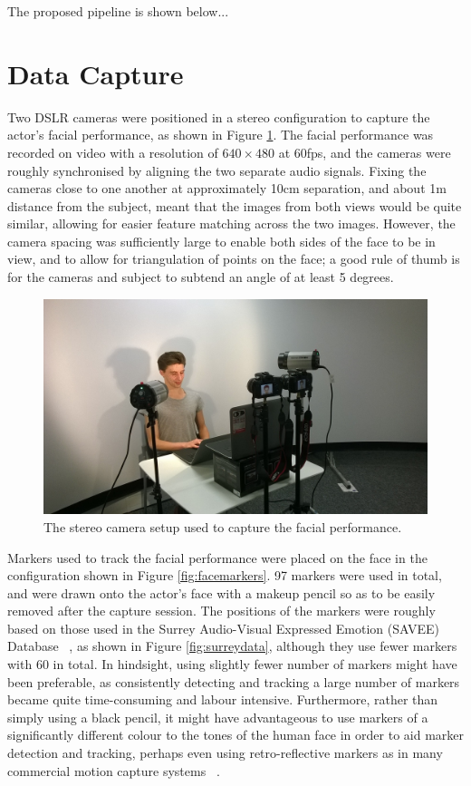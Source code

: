 \documentclass[11pt]{report}
\begin{document}
The proposed pipeline is shown below...

\section{Data Capture} \label{sec:datacapture}

Two DSLR cameras were positioned in a stereo configuration to capture the actor's facial performance, as shown in Figure \ref{fig:setup1}. The facial performance was recorded on video with a resolution of $640 \times 480$ at 60fps, and the cameras were roughly synchronised by aligning the two separate audio signals. Fixing the cameras close to one another at approximately 10cm separation, and about 1m distance from the subject, meant that the images from both views would be quite similar, allowing for easier feature matching across the two images. However, the camera spacing was sufficiently large to enable both sides of the face to be in view, and to allow for triangulation of points on the face; a good rule of thumb is for the cameras and subject to subtend an angle of at least 5 degrees. 

\begin{figure}[htbp!]
\centering
\includegraphics[width=\textwidth]{img/setup1}
	\caption{The stereo camera setup used to capture the facial performance.}
	\label{fig:setup1}
\end{figure}

Markers used to track the facial performance were placed on the face in the configuration shown in Figure \ref{fig:facemarkers}. 97 markers were used in total, and were drawn onto the actor's face with a makeup pencil so as to be easily removed after the capture session. The positions of the markers were roughly based on those used in the Surrey Audio-Visual Expressed Emotion (SAVEE) Database ~\cite{Surrey}, as shown in Figure \ref{fig:surreydata}, although they use fewer markers with 60 in total. In hindsight, using slightly fewer number of markers might have been preferable, as consistently detecting and tracking a large number of markers became quite time-consuming and labour intensive. Furthermore, rather than simply using a black pencil, it might have advantageous to use markers of a significantly different colour to the tones of the human face in order to aid marker detection and tracking, perhaps even using retro-reflective markers as in many commercial motion capture systems ~\cite{Vicon}.
\end{document}
